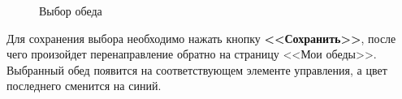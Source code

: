 \documentclass[a4paper]{article}
\begin{document}
\begin{figure}[h]
\begin{minipage}[h]{0.49\linewidth}
\end{minipage}
\caption{Выбор обеда}
\label{fig:image29}
\end{figure}

Для сохранения выбора необходимо нажать кнопку \textbf{<<Сохранить>>}, после чего произойдет перенаправление обратно на страницу <<Мои обеды>>. Выбранный обед появится на соответствующем элементе управления, а цвет последнего сменится на синий.
\end{document}
